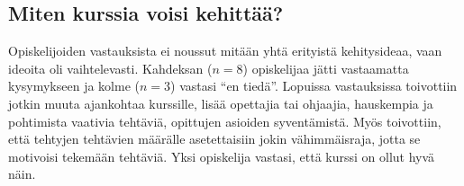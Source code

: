 \subsection{Miten kurssia voisi kehittää?}
Opiskelijoiden vastauksista ei noussut mitään yhtä erityistä kehitysideaa, vaan ideoita oli vaihtelevasti. Kahdeksan ($n=8$) opiskelijaa jätti vastaamatta kysymykseen ja kolme ($n=3$) vastasi ``en tiedä''. Lopuissa vastauksissa toivottiin jotkin muuta ajankohtaa kurssille, lisää opettajia tai ohjaajia, hauskempia ja pohtimista vaativia tehtäviä, opittujen asioiden syventämistä. Myös toivottiin, että tehtyjen tehtävien määrälle asetettaisiin jokin vähimmäisraja, jotta se motivoisi tekemään tehtäviä. Yksi opiskelija vastasi, että kurssi on ollut hyvä näin. 



